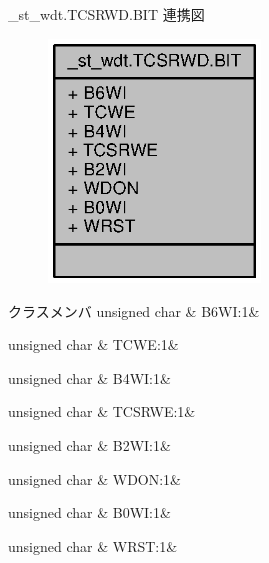 \+\_\+st\+\_\+wdt.\+T\+C\+S\+R\+W\+D.\+B\+I\+T 連携図
\nopagebreak
\begin{figure}[H]
\begin{center}
\leavevmode
\includegraphics[width=160pt]{dd/dc0/struct__st__wdt_8TCSRWD_8BIT__coll__graph}
\end{center}
\end{figure}
\begin{DoxyFields}{クラスメンバ}
unsigned char\label{3694s_8h_a9dffaf7e8713de374281a70be07c8569}
&
B6\+W\+I\+:1&
\\
\hline

unsigned char\label{3694s_8h_a9a8b276eea8d4ee8f34bae61ec8d5e8e}
&
T\+C\+W\+E\+:1&
\\
\hline

unsigned char\label{3694s_8h_a4865305c209a84fa1da536def9f44be8}
&
B4\+W\+I\+:1&
\\
\hline

unsigned char\label{3694s_8h_ad9ad267291fe1ad3d463938796e0c1e3}
&
T\+C\+S\+R\+W\+E\+:1&
\\
\hline

unsigned char\label{3694s_8h_a410b47b90714417d703aa6d2a2b9a586}
&
B2\+W\+I\+:1&
\\
\hline

unsigned char\label{3694s_8h_ac1d6d84c3711d8f59cab3508122b1e84}
&
W\+D\+O\+N\+:1&
\\
\hline

unsigned char\label{3694s_8h_a5be4e0fdfa6225401eb6477538b64162}
&
B0\+W\+I\+:1&
\\
\hline

unsigned char\label{3694s_8h_a97cf32b920d94da83902e01c2e220081}
&
W\+R\+S\+T\+:1&
\\
\hline

\end{DoxyFields}
\label{union__st__wdt_8TMWD}
